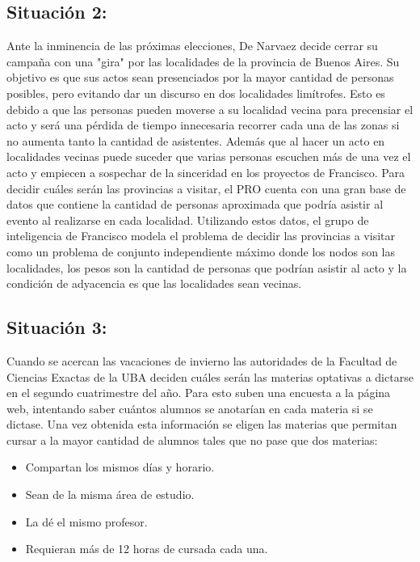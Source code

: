 \documentclass[a4paper,11pt] {article}
\begin{document}
\subsection*{Situación 2:}

Ante la inminencia de las próximas elecciones, De Narvaez decide cerrar su campaña con una "gira" por las localidades de la provincia de Buenos Aires. Su objetivo es que sus actos sean presenciados por la mayor cantidad de personas posibles, pero evitando dar un discurso
en dos localidades limítrofes. Esto es debido a que las personas pueden moverse a su localidad vecina para precensiar el acto y será una pérdida de tiempo innecesaria recorrer cada una de las zonas si no aumenta tanto la cantidad de asistentes. 
Además que al hacer un acto en localidades vecinas puede suceder que varias personas escuchen más de una vez el acto y empiecen a sospechar de la sinceridad en los proyectos de Francisco.
Para decidir cuáles serán las provincias a visitar, el PRO cuenta con una gran base de datos que contiene la cantidad de personas aproximada que podría asistir al evento al realizarse en cada localidad. Utilizando estos datos, el grupo de inteligencia de Francisco
modela el problema de decidir las provincias a visitar como un problema de conjunto independiente máximo donde los nodos son las localidades, los pesos son la cantidad de personas que podrían asistir al acto y la condición de adyacencia es que las localidades sean vecinas.
	
\subsection*{Situación 3:}

Cuando se acercan las vacaciones de invierno las autoridades de la Facultad de Ciencias Exactas de la UBA deciden cuáles serán las materias optativas a dictarse en el segundo cuatrimestre del año.
Para esto suben una encuesta a la página web, intentando saber cuántos alumnos se anotarían en cada materia si se dictase. Una vez obtenida esta información se eligen las materias que permitan cursar a la mayor cantidad de alumnos tales que no pase que dos materias:

\begin{itemize}
\item Compartan los mismos días y horario.
\item Sean de la misma área de estudio.
\item La dé el mismo profesor.
\item Requieran más de 12 horas de cursada cada una.
\end{itemize}
\end{document}

